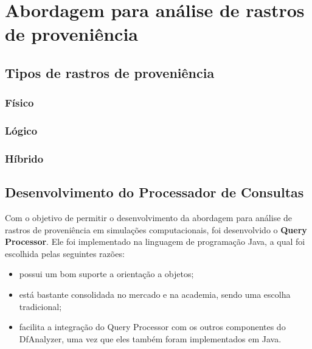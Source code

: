 
\chapter{Abordagem para análise de rastros de proveniência}%
\label{chap:rastros-de-proveniencia}
 
\section{Tipos de rastros de proveniência}%
\label{sec:tipos-de-rastros-de-proveniencia}


 

\subsection{Físico}

\subsection{Lógico}

\subsection{Híbrido}

\section{Desenvolvimento do Processador de Consultas}

Com o objetivo de permitir o desenvolvimento da abordagem para análise de rastros de proveniência em simulações computacionais, foi desenvolvido o \textbf{Query Processor}. Ele foi implementado na linguagem de programação Java, a qual foi escolhida pelas seguintes razões:

\begin{itemize}
    \item possui um bom suporte a orientação a objetos;
    \item está bastante consolidada no mercado e na academia, sendo uma escolha tradicional;
    \item facilita a integração do Query Processor com os outros componentes do DfAnalyzer, uma vez que eles também foram implementados em Java.
\end{itemize}

